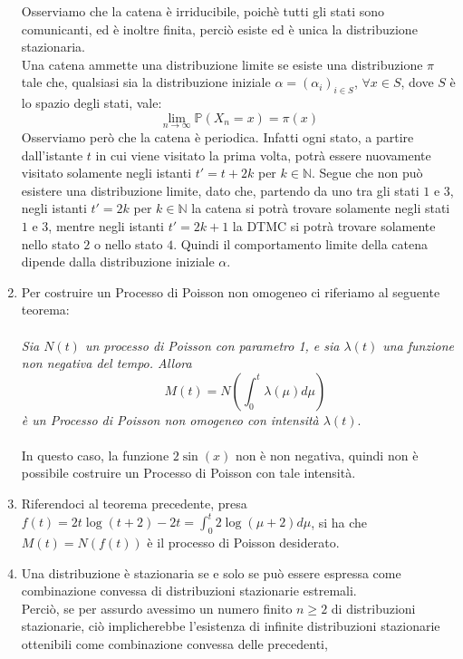 \documentclass[
	12pt, %
]{fphw}
\begin{document}
\begin{enumerate}
	Osserviamo che la catena è irriducibile, poichè tutti gli stati sono comunicanti, ed è inoltre finita, perciò esiste ed è unica la distribuzione stazionaria.\\
	Una catena ammette una distribuzione limite se esiste una distribuzione $\pi$ tale che, 
	qualsiasi sia la distribuzione iniziale $\alpha = (\alpha_i)_{i \in S}$, $\forall x \in S$, dove $S$ è lo spazio degli stati, vale:
	\begin{equation*}
		\lim_{n \to \infty}  \mathbb{P} (X_n = x) = \pi (x)
	\end{equation*}
	Osserviamo però che la catena è periodica. Infatti ogni stato, a partire dall'istante $t$ in cui viene visitato la prima volta, 
	potrà essere nuovamente visitato solamente negli istanti $t' = t + 2k$ per $k\in \mathbb{N}$. Segue che non può esistere una distribuzione limite, 
	dato che, partendo da uno tra gli stati $1$ e $3$, negli istanti $t' = 2k$ per $k \in \mathbb{N}$ la catena si potrà trovare solamente negli stati $1$ e $3$, mentre negli
	istanti $t' = 2k + 1$ la DTMC si potrà trovare solamente nello stato $2$ o nello stato $4$.
	Quindi il comportamento limite della catena dipende dalla distribuzione iniziale $\alpha$.
	\item Per costruire un Processo di Poisson non omogeneo ci riferiamo al seguente teorema:\\
	\\
	\null\quad \textit{Sia $N(t)$ un processo di Poisson con parametro 1, e sia $\lambda(t)$ una funzione\\
	\null\quad non negativa del tempo. Allora
	\begin{equation*}
		\quad M(t) = N(\int_0^t \lambda(\mu)d\mu)
	\end{equation*}
	\null\quad è un Processo di Poisson non omogeneo con intensità $\lambda(t)$}.\\
	\\
	In questo caso, la funzione $2\sin(x)$ non è non negativa, quindi non è possibile costruire un Processo di Poisson con tale intensità.
	\item Riferendoci al teorema precedente, presa $f(t) = 2t\log(t+2) - 2t = \int_0^t 2\log(\mu + 2)d\mu$, 
	si ha che $M(t) = N(f(t))$ è il processo di Poisson desiderato.
	\item Una distribuzione è stazionaria se e solo se può essere espressa come combinazione convessa di distribuzioni stazionarie estremali.\\
	Perciò, se per assurdo avessimo un numero finito $n \ge 2$ di distribuzioni stazionarie, ciò implicherebbe l'esistenza di infinite distribuzioni stazionarie ottenibili come combinazione convessa delle precedenti,

\end{enumerate}
\end{document}

